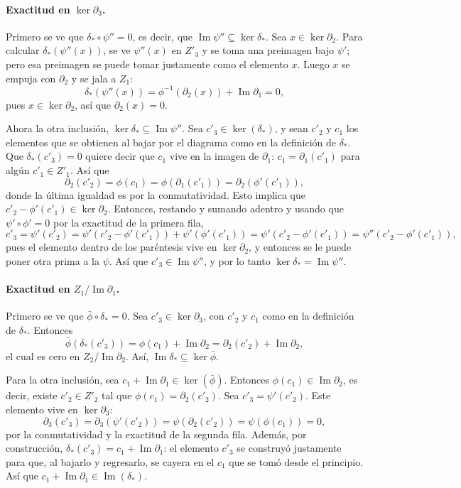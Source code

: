 \documentclass[11pt]{article}
\begin{document}
\paragraph{Exactitud en $\ker\partial_3$.} Primero se ve que $\delta_*\circ\psi''=0$, es decir, que $\operatorname{Im}\psi''\subseteq\ker\delta_*$. Sea $x\in\ker\partial_2$. Para calcular $\delta_*(\psi''(x))$, se ve $\psi''(x)$ en $Z'_3$ y se toma una preimagen bajo $\psi'$; pero esa preimagen se puede tomar justamente como el elemento $x$. Luego $x$ se empuja con $\partial_2$ y se jala a $Z_1$:
\[
  \delta_*(\psi''(x))=\phi^{-1}(\partial_2(x))+\operatorname{Im}\partial_1=0,
\]
pues $x\in\ker\partial_2$, así que $\partial_2(x)=0$.

Ahora la otra inclusión, $\ker\delta_*\subseteq\operatorname{Im}\psi''$. Sea $c'_3\in\ker(\delta_*)$, y sean $c'_2$ y $c_1$ los elementos que se obtienen al bajar por el diagrama como en la definición de $\delta_*$. Que $\delta_*(c'_3)=0$ quiere decir que $c_1$ vive en la imagen de $\partial_1$: $c_1=\partial_1(c'_1)$ para algún $c'_1\in Z'_1$. Así que
\[
  \partial_2(c'_2)=\phi(c_1)=\phi(\partial_1(c'_1))=\partial_2(\phi'(c'_1)),
\]
donde la última igualdad es por la conmutatividad. Esto implica que $c'_2-\phi'(c'_1)\in\ker\partial_2$. Entonces, restando y sumando adentro y usando que $\psi'\circ\phi'=0$ por la exactitud de la primera fila,
\[
  c'_3=\psi'(c'_2)=\psi'(c'_2-\phi'(c'_1))+\psi'(\phi'(c'_1))=\psi'(c'_2-\phi'(c'_1))=\psi''(c'_2-\phi'(c'_1)),
\]
pues el elemento dentro de los paréntesis vive en $\ker\partial_2$, y entonces se le puede poner otra prima a la $\psi$. Así que $c'_3\in\operatorname{Im}\psi''$, y por lo tanto $\ker\delta_*=\operatorname{Im}\psi''$.

\paragraph{Exactitud en $Z_1/\operatorname{Im}\partial_1$.} Primero se ve que $\bar\phi\circ\delta_*=0$. Sea $c'_3\in\ker\partial_3$, con $c'_2$ y $c_1$ como en la definición de $\delta_*$. Entonces
\[
  \bar\phi(\delta_*(c'_3))=\phi(c_1)+\operatorname{Im}\partial_2=\partial_2(c'_2)+\operatorname{Im}\partial_2,
\]
el cual es cero en $Z_2/\operatorname{Im}\partial_2$. Así, $\operatorname{Im}\delta_*\subseteq\ker\bar\phi$.

Para la otra inclusión, sea $c_1+\operatorname{Im}\partial_1\in\ker(\bar\phi)$. Entonces $\phi(c_1)\in\operatorname{Im}\partial_2$, es decir, existe $c'_2\in Z'_2$ tal que $\phi(c_1)=\partial_2(c'_2)$. Sea $c'_3=\psi'(c'_2)$. Este elemento vive en $\ker\partial_3$:
\[
  \partial_3(c'_3)=\partial_3(\psi'(c'_2))=\psi(\partial_2(c'_2))=\psi(\phi(c_1))=0,
\]
por la conmutatividad y la exactitud de la segunda fila. Además, por construcción, $\delta_*(c'_3)=c_1+\operatorname{Im}\partial_1$: el elemento $c'_3$ se construyó justamente para que, al bajarlo y regresarlo, se cayera en el $c_1$ que se tomó desde el principio. Así que $c_1+\operatorname{Im}\partial_1\in\operatorname{Im}(\delta_*)$.
\end{document}
